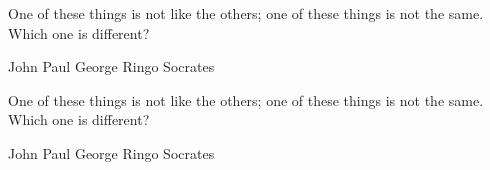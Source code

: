 \documentclass[a4paper,answers,addpoints]{exam}
\begin{document}
\begin{questions}
\question[5]
One of these things is not like the others; one of these
things is not the same. Which one is different?

\begin{checkboxes}
\choice John
\choice Paul
\choice George
\choice Ringo
\CorrectChoice Socrates
\end{checkboxes}
\question[5]
One of these things is not like the others; one of these
things is not the same. Which one is different?

\begin{oneparcheckboxes}%
\choice John
\choice Paul
\choice George
\choice Ringo
\CorrectChoice Socrates
\end{oneparcheckboxes}


\end{questions}
\end{document}
